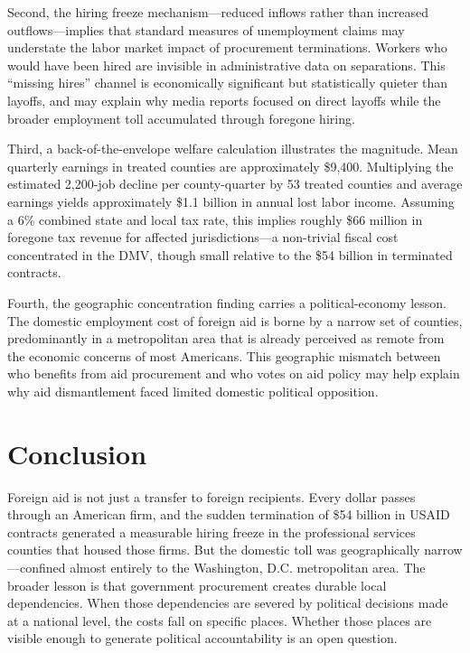 \documentclass[12pt]{article}
\begin{document}
Second, the hiring freeze mechanism---reduced inflows rather than increased outflows---implies that standard measures of unemployment claims may understate the labor market impact of procurement terminations. Workers who would have been hired are invisible in administrative data on separations. This ``missing hires'' channel is economically significant but statistically quieter than layoffs, and may explain why media reports focused on direct layoffs while the broader employment toll accumulated through foregone hiring.

Third, a back-of-the-envelope welfare calculation illustrates the magnitude. Mean quarterly earnings in treated counties are approximately \$9,400. Multiplying the estimated 2,200-job decline per county-quarter by 53 treated counties and average earnings yields approximately \$1.1 billion in annual lost labor income. Assuming a 6\% combined state and local tax rate, this implies roughly \$66 million in foregone tax revenue for affected jurisdictions---a non-trivial fiscal cost concentrated in the DMV, though small relative to the \$54 billion in terminated contracts.

Fourth, the geographic concentration finding carries a political-economy lesson. The domestic employment cost of foreign aid is borne by a narrow set of counties, predominantly in a metropolitan area that is already perceived as remote from the economic concerns of most Americans. This geographic mismatch between who benefits from aid procurement and who votes on aid policy may help explain why aid dismantlement faced limited domestic political opposition.

\section{Conclusion}

Foreign aid is not just a transfer to foreign recipients. Every dollar passes through an American firm, and the sudden termination of \$54 billion in USAID contracts generated a measurable hiring freeze in the professional services counties that housed those firms. But the domestic toll was geographically narrow---confined almost entirely to the Washington, D.C. metropolitan area. The broader lesson is that government procurement creates durable local dependencies. When those dependencies are severed by political decisions made at a national level, the costs fall on specific places. Whether those places are visible enough to generate political accountability is an open question.
\end{document}

